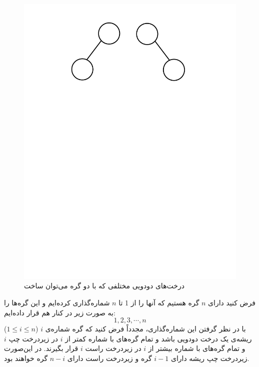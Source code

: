 \begin{figure}
\begin{center}
\includegraphics[scale=0.33]{figs/ch5/binary_trees_with_two_nodes.pdf}
\caption{درخت‌های دودویی مختلفی که با دو گره می‌توان ساخت}\label{ch5:fig:2nodesBinTrees}
\end{center}
\end{figure}


فرض کنید دارای {$n$} گره هستیم که آنها را از 1 تا {$n$} شماره‌گذاری کرده‌ایم و این گره‌ها را به صورت زیر در کنار هم قرار داده‌ایم:
$$
1,2,3,\cdots ,n
$$
با در نظر گرفتن این شماره‌گذاری، مجدداً فرض کنید که گره شماره‌ی {$i$} ({$1\leqslant i \leqslant n$}) ریشه‌ی یک درخت دودویی باشد و تمام گره‌های با شماره کمتر از {$i$} در زیردرخت چپ {$i$} و تمام گره‌های با شماره بیشتر از {$i$} در زیردرخت راست {$i$} قرار بگیرند. در این‌صورت زیردرخت چپ ریشه دارای {$i-1$} گره و  زیردرخت راست دارای {$n-i$} گره خواهند بود.

